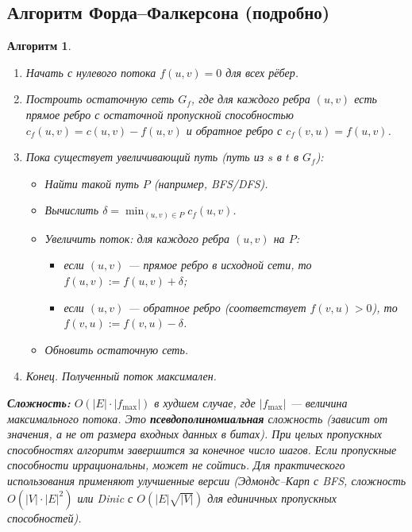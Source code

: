 \documentclass[12pt]{article}
\newtheorem{algorithm}{Алгоритм}
\begin{document}
\begin{enumerate}
\subsection{Алгоритм Форда–Фалкерсона (подробно)}
\begin{algorithm}
    \begin{enumerate}
        \item Начать с нулевого потока \(f(u,v)=0\) для всех рёбер.
        \item Построить остаточную сеть \(G_f\), где для каждого ребра \((u,v)\) есть прямое ребро с остаточной пропускной способностью \(c_f(u,v) = c(u,v) - f(u,v)\) и обратное ребро с \(c_f(v,u) = f(u,v)\).
        \item Пока существует увеличивающий путь (путь из \(s\) в \(t\) в \(G_f\)):
            \begin{itemize}
                \item Найти такой путь \(P\) (например, BFS/DFS).
                \item Вычислить \(\delta = \min_{(u,v) \in P} c_f(u,v)\).
                \item Увеличить поток: для каждого ребра \((u,v)\) на \(P\):
                    \begin{itemize}
                        \item если \((u,v)\) — прямое ребро в исходной сети, то \(f(u,v) := f(u,v) + \delta\);
                        \item если \((u,v)\) — обратное ребро (соответствует \(f(v,u)>0\)), то \(f(v,u) := f(v,u) - \delta\).
                    \end{itemize}
                \item Обновить остаточную сеть.
            \end{itemize}
        \item Конец. Полученный поток максимален.
    \end{enumerate}
    \textbf{Сложность:} \(O(|E| \cdot |f_{\max}|)\) в худшем случае, где \(|f_{\max}|\) — величина максимального потока. Это \textbf{псевдополиномиальная} сложность (зависит от значения, а не от размера входных данных в битах). При целых пропускных способностях алгоритм завершится за конечное число шагов. Если пропускные способности иррациональны, может не сойтись. Для практического использования применяют улучшенные версии (Эдмондс–Карп с BFS, сложность \(O(|V|\cdot|E|^2)\) или Dinic с \(O(|E|\sqrt{|V|})\) для единичных пропускных способностей).
\end{algorithm}


\end{enumerate}
\end{document}
